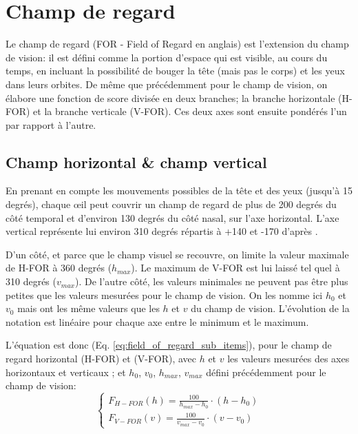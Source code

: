 	\section{Champ de regard}
	\par Le champ de regard (FOR - Field of Regard en anglais) est l'extension du champ de vision: il est défini comme la portion d'espace qui est visible, au cours du temps, en incluant la possibilité de bouger la tête (mais pas le corps) et les yeux dans leurs orbites. De même que précédemment pour le champ de vision, on élabore une fonction de score divisée en deux branches; la branche horizontale (H-FOR) et la branche verticale (V-FOR). Ces deux axes sont ensuite pondérés l'un par rapport à l'autre.
	
	\subsection{Champ horizontal \& champ vertical}
	\par En prenant en compte les mouvements possibles de la tête et des yeux (jusqu'à 15 degrés), chaque œil peut couvrir un champ de regard de plus de 200 degrés du côté temporal et d'environ 130 degrés du côté nasal, sur l'axe horizontal. L'axe vertical représente lui environ 310 degrés répartis à +140 et -170 d'après \citep{fuchs_traite_2003}.
	
	\par D'un côté, et parce que le champ visuel se recouvre, on limite la valeur maximale de H-FOR à 360 degrés ($h_{max}$). Le maximum de V-FOR est lui laissé tel quel à 310 degrés ($v_{max}$). De l'autre côté, les valeurs minimales ne peuvent pas être plus petites que les valeurs mesurées pour le champ de vision. On les nomme ici $h_0$ et $v_0$ mais ont les même valeurs que les $h$ et $v$ du champ de vision. L'évolution de la notation est linéaire pour chaque axe entre le minimum et le maximum.
	
	\par L'équation est donc (Eq. \ref{eq:field_of_regard_sub_items}), pour le champ de regard horizontal (H-FOR) et (V-FOR), avec $h$ et $v$ les valeurs mesurées des axes horizontaux et verticaux ; et $h_{0}$, $v_{0}$, $h_{max}$, $v_{max}$ défini précédemment pour le champ de vision:
	\begin{equation}
	\begin{cases}
		F_{H-FOR}(h) = \frac{100}{h_{max} - h_0} \cdot (h - h_0)\\
		F_{V-FOR}(v) = \frac{100}{v_{max} - v_0} \cdot (v - v_0)
	\end{cases}
	\label{eq:field_of_regard_sub_items}
	\end{equation}
	
